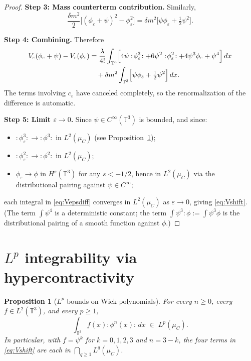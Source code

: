 \documentclass[12pt]{article}
\newtheorem{proposition}[theorem]{Proposition}
\newcommand{\T}{\mathbb{T}}
\newcommand{\wick}[1]{:\!#1\!:}
\begin{document}
\begin{proof}
\textbf{Step 3: Mass counterterm contribution.}
Similarly,
\[
  \frac{\delta m^2}{2}\bigl[(\phi_\varepsilon+\psi)^2 - \phi_\varepsilon^2\bigr]
  = \delta m^2\bigl[\psi\phi_\varepsilon + \tfrac{1}{2}\psi^2\bigr].
\]

\textbf{Step 4: Combining.}
Therefore
\begin{align}
  V_\varepsilon(\phi_\varepsilon+\psi) - V_\varepsilon(\phi_\varepsilon)
  &= \frac{\lambda}{4!}\int_{\T^3}
     \Bigl[
       4\psi\wick{\phi_\varepsilon^3}
       + 6\psi^2\wick{\phi_\varepsilon^2}
       + 4\psi^3\phi_\varepsilon
       + \psi^4
     \Bigr]\,dx \notag\\
  &\quad + \delta m^2\int_{\T^3}
     \Bigl[\psi\phi_\varepsilon + \tfrac{1}{2}\psi^2\Bigr]\,dx. \label{eq:Vepsdiff}
\end{align}
The terms involving $c_\varepsilon$ have canceled completely, so the renormalization of the
difference is automatic.

\textbf{Step 5: Limit $\varepsilon\to 0$.}
Since $\psi\in C^\infty(\T^3)$ is bounded, and since:
\begin{itemize}
  \item $\wick{\phi_\varepsilon^3}\to\wick{\phi^3}$ in $L^2(\mu_C)$ (see
        Proposition~\ref{prop:Lp});
  \item $\wick{\phi_\varepsilon^2}\to\wick{\phi^2}$ in $L^2(\mu_C)$;
  \item $\phi_\varepsilon\to\phi$ in $H^s(\T^3)$ for any $s<-1/2$, hence in $L^2(\mu_C)$ via
        the distributional pairing against $\psi\in C^\infty$;
\end{itemize}
each integral in \eqref{eq:Vepsdiff} converges in $L^2(\mu_C)$ as $\varepsilon\to 0$, giving
\eqref{eq:Vshift}.  (The term $\int\psi^4$ is a deterministic constant; the term
$\int\psi^3\wick{\phi}=\int\psi^3\phi$ is the distributional pairing of a smooth function against
$\phi$.)
\end{proof}

\section{$L^p$ integrability via hypercontractivity}

\begin{proposition}[$L^p$ bounds on Wick polynomials]\label{prop:Lp}
For every $n\ge 0$, every $f\in L^2(\T^3)$, and every $p\ge 1$,
\[
  \int_{\T^3} f(x)\wick{\phi^n(x)}\,dx \;\in\; L^p(\mu_C).
\]
In particular, with $f=\psi^k$ for $k=0,1,2,3$ and $n=3-k$, the four terms in
\eqref{eq:Vshift} are each in $\bigcap_{q\ge 1}L^q(\mu_C)$.
\end{proposition}
\end{document}
